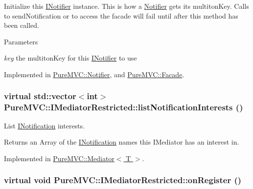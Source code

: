 Initialize this \hyperlink{class_pure_m_v_c_1_1_i_notifier}{INotifier} instance. This is how a \hyperlink{class_pure_m_v_c_1_1_notifier}{Notifier} gets its multitonKey. Calls to sendNotification or to access the facade will fail until after this method has been called.


\begin{DoxyParams}{Parameters}
\item[{\em key}]the multitonKey for this \hyperlink{class_pure_m_v_c_1_1_i_notifier}{INotifier} to use \end{DoxyParams}


Implemented in \hyperlink{class_pure_m_v_c_1_1_notifier_a6910365c70415ba7973401215f57e4af}{PureMVC::Notifier}, and \hyperlink{class_pure_m_v_c_1_1_facade_a94c72ff29f9f42ff084f247b180fb4ad}{PureMVC::Facade}.\hypertarget{class_pure_m_v_c_1_1_i_mediator_restricted_a9b9d790649480769697e1b3e7377c313}{
\subsubsection[{listNotificationInterests}]{\setlength{\rightskip}{0pt plus 5cm}virtual std::vector$<$int$>$ PureMVC::IMediatorRestricted::listNotificationInterests ()}}
\label{class_pure_m_v_c_1_1_i_mediator_restricted_a9b9d790649480769697e1b3e7377c313}


List {\ttfamily \hyperlink{class_pure_m_v_c_1_1_i_notification}{INotification}} interests. \begin{DoxyReturn}{Returns}
an {\ttfamily Array} of the {\ttfamily \hyperlink{class_pure_m_v_c_1_1_i_notification}{INotification}} names this {\ttfamily IMediator} has an interest in. 
\end{DoxyReturn}


Implemented in \hyperlink{class_pure_m_v_c_1_1_mediator_a95473998498b3aadf4af81fa8160ead3}{PureMVC::Mediator$<$ T $>$}.\hypertarget{class_pure_m_v_c_1_1_i_mediator_restricted_a1c9b8d32557fdf7c3b03c7b8a6c1bb05}{
\subsubsection[{onRegister}]{\setlength{\rightskip}{0pt plus 5cm}virtual void PureMVC::IMediatorRestricted::onRegister ()}}
\label{class_pure_m_v_c_1_1_i_mediator_restricted_a1c9b8d32557fdf7c3b03c7b8a6c1bb05}


